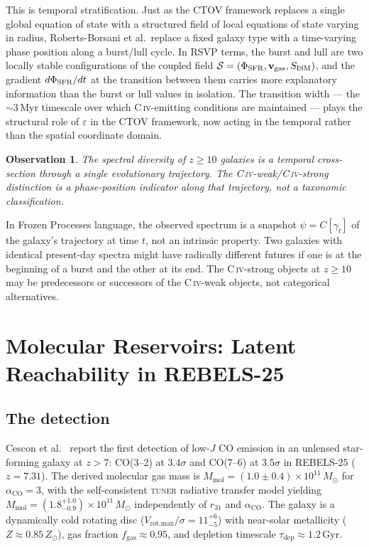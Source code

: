 \documentclass[12pt, oneside]{article}
\newtheorem{observation}{Observation}
\begin{document}
This is temporal stratification. Just as the CTOV framework replaces a single global equation of state with a structured field of local equations of state varying in radius, Roberts-Borsani et al.\ replace a fixed galaxy type with a time-varying phase position along a burst/lull cycle. In RSVP terms, the burst and lull are two locally stable configurations of the coupled field $\mathcal{S} = (\Phi_{\rm SFR}, \mathbf{v}_{\rm gas}, S_{\rm ISM})$, and the gradient $d\Phi_{\rm SFR}/dt$ at the transition between them carries more explanatory information than the burst or lull values in isolation. The transition width --- the $\sim 3$\,Myr timescale over which C\,\textsc{iv}-emitting conditions are maintained --- plays the structural role of $\varepsilon$ in the CTOV framework, now acting in the temporal rather than the spatial coordinate domain.

\begin{observation}
The spectral diversity of $z \geq 10$ galaxies is a temporal cross-section through a single evolutionary trajectory. The C\,\textsc{iv}-weak/C\,\textsc{iv}-strong distinction is a phase-position indicator along that trajectory, not a taxonomic classification.
\end{observation}

In Frozen Processes language, the observed spectrum is a snapshot $\psi = C[\gamma_t]$ of the galaxy's trajectory at time $t$, not an intrinsic property. Two galaxies with identical present-day spectra might have radically different futures if one is at the beginning of a burst and the other at its end. The C\,\textsc{iv}-strong objects at $z \geq 10$ may be predecessors or successors of the C\,\textsc{iv}-weak objects, not categorical alternatives.

\section{Molecular Reservoirs: Latent Reachability in REBELS-25}

\subsection{The detection}

Cescon et al.~\cite{cescon2026} report the first detection of low-$J$ CO emission in an unlensed star-forming galaxy at $z > 7$: CO(3--2) at $3.4\sigma$ and CO(7--6) at $3.5\sigma$ in REBELS-25 ($z = 7.31$). The derived molecular gas mass is $M_{\text{mol}} = (1.0 \pm 0.4) \times 10^{11}\,M_\odot$ for $\alpha_{\text{CO}} = 3$, with the self-consistent \textsc{tuner} radiative transfer model yielding $M_{\text{mol}} = (1.8^{+1.0}_{-0.9}) \times 10^{11}\,M_\odot$ independently of $r_{31}$ and $\alpha_{\text{CO}}$. The galaxy is a dynamically cold rotating disc ($V_{\text{rot,max}}/\sigma = 11^{+6}_{-5}$) with near-solar metallicity ($Z \approx 0.85\,Z_\odot$), gas fraction $f_{\text{gas}} \approx 0.95$, and depletion timescale $\tau_{\text{dep}} \approx 1.2$\,Gyr.
\end{document}
